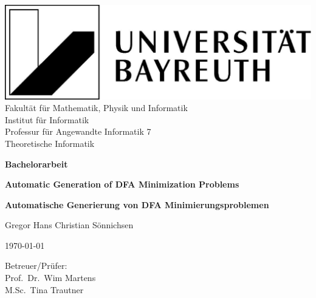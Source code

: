 \documentclass[a4paper, oneside, 11pt]{book}
\theoremstyle{definition}
\theoremstyle{remark}
\begin{document}
	
	\frontmatter
	
	\begin{titlepage}
		{
			\raggedright
			\includegraphics[scale=0.1]{images/UBT-logo.jpg}\\
			\small{
			Fakultät für Mathematik, Physik und Informatik\\
			Institut für Informatik\\
			Professur für Angewandte Informatik 7\\
			Theoretische Informatik}\\
			\vspace{1cm}	
		}
		{\centering\bfseries\Large Bachelorarbeit\par}
		\vspace{1cm}
		{\centering\huge\bfseries Automatic Generation of DFA Minimization Problems\par}
		\vspace{0.7cm}
		{\centering\large\bfseries Automatische Generierung von DFA Minimierungsproblemen\par}
		\vspace{2cm}
		{\centering\large Gregor Hans Christian Sönnichsen\par}
		\vspace{0.4cm}
		{\centering\large \today\par}
		\vfill
		{\large\raggedright
			Betreuer/Prüfer:\\
			Prof.\ Dr.\ Wim Martens\\
			M.Sc.\ Tina Trautner\par
		}
	\end{titlepage}
	
	
	
	
\end{document}
